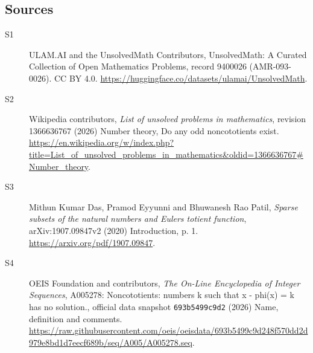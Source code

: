 \documentclass[11pt]{article}
\begin{document}
\subsection{Sources}
\begin{description}
\item[\hypertarget{source:9400026:1}{S1}] ULAM.AI and the UnsolvedMath Contributors, UnsolvedMath: A Curated Collection of Open Mathematics Problems, record 9400026 (AMR-093-0026). CC BY 4.0. \url{https://huggingface.co/datasets/ulamai/UnsolvedMath}.
\item[\hypertarget{source:9400026:2}{S2}] Wikipedia contributors, \emph{List of unsolved problems in mathematics}, revision 1366636767 (2026) Number theory, Do any odd noncototients exist. \url{https://en.wikipedia.org/w/index.php?title=List_of_unsolved_problems_in_mathematics&oldid=1366636767#Number_theory}.
\item[\hypertarget{source:9400026:3}{S3}] Mithun Kumar Das, Pramod Eyyunni and Bhuwanesh Rao Patil, \emph{Sparse subsets of the natural numbers and Euler\textquotesingle s totient function}, arXiv:1907.09847v2 (2020) Introduction, p. 1. \url{https://arxiv.org/pdf/1907.09847}.
\item[\hypertarget{source:9400026:4}{S4}] OEIS Foundation and contributors, \emph{The On-Line Encyclopedia of Integer Sequences}, A005278: Noncototients: numbers k such that x - phi(x) = k has no solution., official data snapshot \texttt{693b5499c9d2} (2026) Name, definition and comments. \url{https://raw.githubusercontent.com/oeis/oeisdata/693b5499c9d248f570dd2d979e8bd1d7eecf689b/seq/A005/A005278.seq}.
\end{description}
\label{end:9400026}
\end{document}
